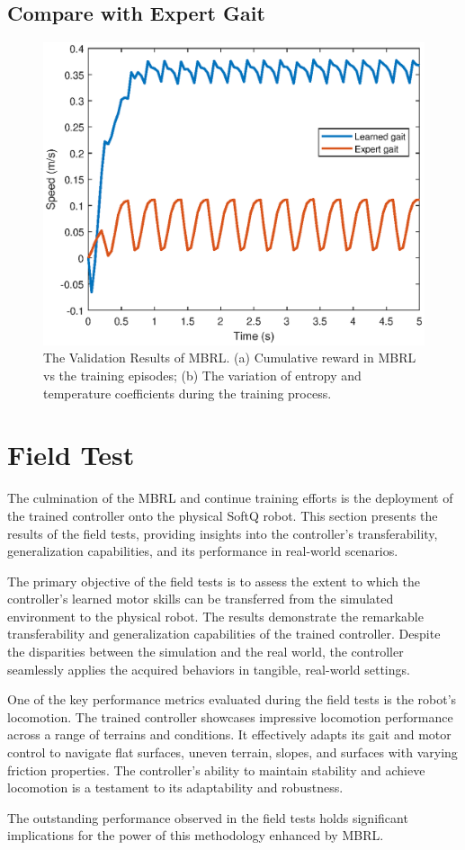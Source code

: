 \subsection{Compare with Expert Gait}
\begin{figure}[htb]
    \centering
    \includegraphics[width=\linewidth]{img/chap5/vsexpert.eps}
    \caption{The Validation Results of MBRL. (a) Cumulative reward in MBRL vs the training episodes; (b) The variation of entropy and temperature coefficients during the training process.}
    \label{fig:vsExp}
\end{figure}


\section{Field Test}
The culmination of the MBRL and continue training efforts is the deployment of the trained controller onto the physical SoftQ robot. This section presents the results of the field tests, providing insights into the controller's transferability, generalization capabilities, and its performance in real-world scenarios.

The primary objective of the field tests is to assess the extent to which the controller's learned motor skills can be transferred from the simulated environment to the physical robot. The results demonstrate the remarkable transferability and generalization capabilities of the trained controller. Despite the disparities between the simulation and the real world, the controller seamlessly applies the acquired behaviors in tangible, real-world settings. 

One of the key performance metrics evaluated during the field tests is the robot's locomotion. The trained controller showcases impressive locomotion performance across a range of terrains and conditions. It effectively adapts its gait and motor control to navigate flat surfaces, uneven terrain, slopes, and surfaces with varying friction properties. The controller's ability to maintain stability and achieve locomotion is a testament to its adaptability and robustness.

The outstanding performance observed in the field tests holds significant implications for the power of this methodology enhanced by MBRL.